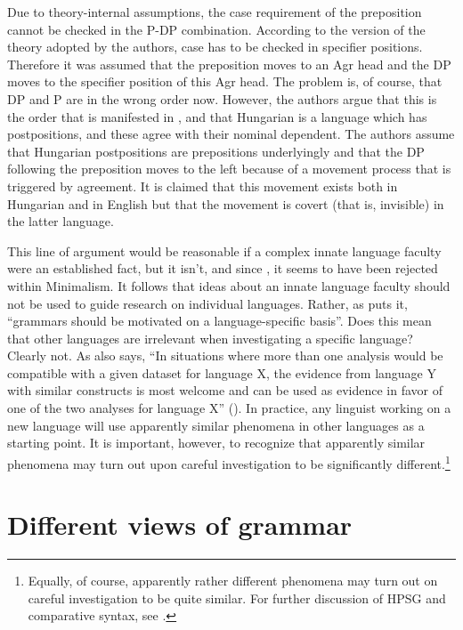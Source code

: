 \documentclass[output=paper
	        ,collection
	        ,collectionchapter
 	        ,biblatex
                ,babelshorthands
                ,newtxmath
                ,draftmode
                ,colorlinks, citecolor=brown
]{langscibook}
\begin{document}
Due to theory-internal assumptions, the case requirement of the preposition cannot be checked in the
P-DP combination. According to the version of the theory adopted by the authors, case has to be
checked in specifier positions. Therefore it was assumed that the preposition moves to an Agr head
and the DP moves to the specifier position of this Agr head. The problem is, of course, that DP and P
are in the wrong order now. However, the authors argue that this is the order that is manifested in
, and that Hungarian is a language which has postpositions, and these agree with
their nominal dependent. The authors assume that Hungarian postpositions are prepositions
underlyingly and that the DP following the preposition moves to the left because of a movement
process that is triggered by agreement. It is claimed that this movement exists both in Hungarian and in English but
that the movement is covert (that is, invisible) in the latter language.

This line of argument would be reasonable if a complex innate language
faculty were an established fact, but it isn't, and since \citet*{HCF2002a}, it seems to have been
rejected within Minimalism. It follows that ideas about an innate language faculty should not be
used to guide research on individual languages. Rather, as \citet[25]{MuellerCoreGram} puts it,
``grammars should be motivated on a language-specific basis''. Does this mean that other languages are
irrelevant when investigating a specific language? Clearly not. As 
also says, ``In situations where more than one analysis would be compatible with a given dataset
for language X, the evidence from language Y with similar constructs is most welcome and can be used
as evidence in favor of one of the two analyses for language X'' (\citeyear[43]{MuellerCoreGram}). In
practice, any linguist working on a new language will use apparently similar phenomena in other
languages as a starting point. It is important, however, to recognize that apparently similar
phenomena may turn out upon careful investigation to be significantly different.\footnote{%
  Equally, of course, apparently rather different phenomena may turn out on careful investigation to
  be quite similar. For further discussion of HPSG and comparative syntax, see .%
} 

\section{Different views of grammar}
\label{sec:min-views-grammar}
\end{document}

